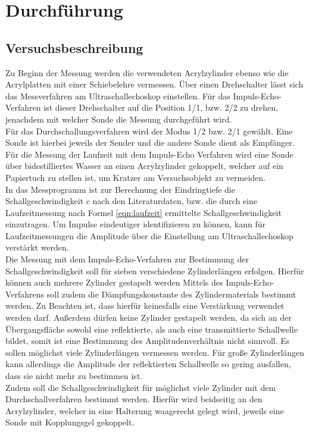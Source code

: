 \section{Durchführung}
\label{sec:Durchführung}



\subsection{Versuchsbeschreibung}
\label{sec:Versuchsbeschreibung}
Zu Beginn der Messung werden die verwendeten Acrylzylinder ebenso wie die Acrylplatten mit einer Schiebelehre vermessen.
Über einen Drehschalter lässt sich das Messverfahren am Ultraschallechoskop einstellen.
Für das Impuls-Echo-Verfahren ist dieser Drehschalter auf die Position 1/1, bzw. 2/2 zu drehen, jenachdem mit welcher Sonde die Messung durchgeführt wird.\\
Für das Durchschallungsverfahren wird der Modus 1/2 bzw. 2/1 gewählt.
Eine Sonde ist hierbei jeweils der Sender und die andere Sonde dient als Empfänger.
Für die Messung der Laufzeit mit dem Impuls-Echo Verfahren wird eine Sonde über bidestilliertes Wasser an einen Acrylzylinder gekoppelt, welcher auf ein Papiertuch zu stellen ist, um Kratzer am Versuchsobjekt zu vermeiden.\\
In das Messprogramm ist zur Berechnung der Eindringtiefe die Schallgeschwindigkeit $c$ nach den Literaturdaten, bzw. die durch eine Laufzeitmessung nach Formel \eqref{eqn:laufzeit} ermittelte Schallgeschwindigkeit einzutragen.
Um Impulse eindeutiger identifizieren zu können, kann für Laufzeitmessungen die Amplitude über die Einstellung am Ultraschallechoskop verstärkt werden.\\
Die Messung mit dem Impuls-Echo-Verfahren zur Bestimmung der Schallgeschwindigkeit soll für sieben verschiedene Zylinderlängen erfolgen. Hierfür können auch mehrere Zylinder gestapelt werden
Mittels des Impuls-Echo-Verfahrens soll zudem die Dämpfungskonstante des Zylindermaterials bestimmt werden. Zu Beachten ist, dass hierfür keinesfalls eine Verstärkung verwendet werden darf. Außerdem dürfen keine Zylinder gestapelt werden, da sich an der Übergangsfläche sowohl eine reflektierte, als auch eine transmittierte Schallwelle bildet, somit ist eine Bestimmung des Amplitudenverhältnis nicht sinnvoll.
Es sollen möglichst viele Zylinderlängen vermessen werden. Für große Zylinderlängen kann allerdings die Amplitude der reflektierten Schallwelle so gering ausfallen, dass sie nicht mehr zu bestimmen ist.
\\Zudem soll die Schallgeschwindigkeit für möglichst viele Zylinder mit dem Durchschallverfahren bestimmt werden. Hierfür wird beidseitig an den Acrylzylinder, welcher in eine Halterung waagerecht gelegt wird, jeweils eine Sonde mit Kopplungsgel gekoppelt.
